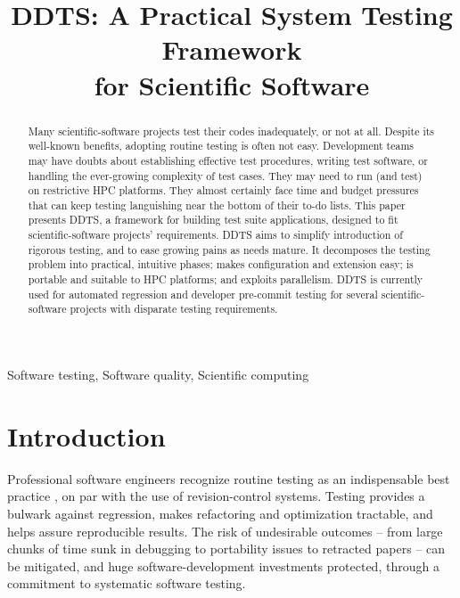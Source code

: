 \documentclass[conference]{IEEEtran}
\begin{document}
\thispagestyle{plain} %
\pagestyle{plain}     %
\title{DDTS: A Practical System Testing Framework\\for Scientific Software}
\author{
\and
{}
}
\maketitle
\begin{abstract}
Many scientific-software projects test their codes inadequately, or not at all. Despite its well-known benefits, adopting routine testing is often not easy. Development teams may have doubts about establishing effective test procedures, writing test software, or handling the ever-growing complexity of test cases. They may need to run (and test) on restrictive HPC platforms. They almost certainly face time and budget pressures that can keep testing languishing near the bottom of their to-do lists. This paper presents DDTS, a framework for building test suite applications, designed to fit scientific-software projects' requirements. DDTS aims to simplify introduction of rigorous testing, and to ease growing pains as needs mature. It decomposes the testing problem into practical, intuitive phases; makes configuration and extension easy; is portable and suitable to HPC platforms; and exploits parallelism. DDTS is currently used for automated regression and developer pre-commit testing for several scientific-software projects with disparate testing requirements.
\end{abstract}
\begin{keywords}
Software testing, Software quality, Scientific computing
\end{keywords}
\section{Introduction}
Professional software engineers recognize routine testing as an indispensable best practice \cite{prags}\cite{fowler-ci}\cite{extreme}\cite{batlab}, on par with the use of revision-control systems. Testing provides a bulwark against regression, makes refactoring and optimization tractable, and helps assure reproducible results. The risk of undesirable outcomes -- from large chunks of time sunk in debugging \cite{comp-sci-survey} to portability issues \cite{cig} to retracted papers \cite{does-not-compute} -- can be mitigated, and huge software-development investments protected, through a commitment to systematic software testing.
\end{document}
